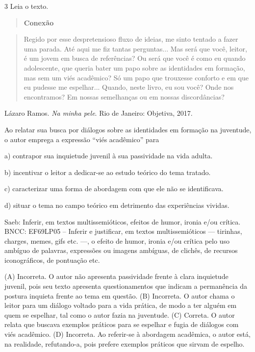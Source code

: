 \num{3} Leia o texto.

\begin{quote}
\textbf{Conexão}
\end{quote}

\begin{quote}
Regido por esse despretensioso fluxo de ideias, me sinto tentado a fazer
uma parada. Até aqui me fiz tantas perguntas... Mas será que você,
leitor, é um jovem em busca de referências? Ou será que você é como eu
quando adolescente, que queria bater um papo sobre as identidades em
formação, mas sem um viés acadêmico? Só um papo que trouxesse conforto e
em que eu pudesse me espelhar... Quando, neste livro, eu sou você? Onde
nos encontramos? Em nossas semelhanças ou em nossas discordâncias?
\end{quote}

Lázaro Ramos. \emph{Na minha pele}. Rio de Janeiro: Objetiva, 2017.

Ao relatar sua busca por diálogos sobre as identidades em formação na
juventude, o autor emprega a expressão ``viés acadêmico'' para

a) contrapor sua inquietude juvenil à sua passividade na vida adulta.

b) incentivar o leitor a dedicar-se ao estudo teórico do tema tratado.

c) caracterizar uma forma de abordagem com que ele não se identificava.

d) situar o tema no campo teórico em detrimento das experiências
vividas.

Saeb: Inferir, em textos multissemióticos, efeitos de humor, ironia e/ou
crítica. BNCC: EF69LP05 -- Inferir e justificar, em textos
multissemióticos --- tirinhas, charges, memes, gifs etc. ---, o efeito
de humor, ironia e/ou crítica pelo uso ambíguo de palavras, expressões
ou imagens ambíguas, de clichês, de recursos iconográficos, de pontuação
etc.

(A) Incorreta. O autor não apresenta passividade frente à clara
inquietude juvenil, pois seu texto apresenta questionamentos que indicam
a permanência da postura inquieta frente ao tema em questão. (B)
Incorreta. O autor chama o leitor para um diálogo voltado para a vida
prática, de modo a ter alguém em quem se espelhar, tal como o autor
fazia na juventude. (C) Correta. O autor relata que buscava exemplos
práticos para se espelhar e fugia de diálogos com viés acadêmico. (D)
Incorreta. Ao referir-se à abordagem acadêmica, o autor está, na
realidade, refutando-a, pois prefere exemplos práticos que sirvam de
espelho.

